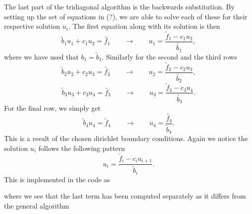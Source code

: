 \documentclass[a4paper,10pt]{article}
\begin{document}
The last part of the tridiagonal algorithm is the backwards substitution. By setting up the set of equations in (?), we are able to solve each of these for their respective solution $u_i$. The first equation along with its solution is then
\[
\tilde{b}_1 u_1 + c_1 u_2 = \tilde{f_1} \qquad \rightarrow \qquad u_1 = \frac{\tilde{f}_1 - c_1 u_2}{\tilde{b_1}},
\]
where we have used that $b_1 = \tilde{b}_1$. Similarly for the second and the third rows
\[
\tilde{b}_2 u_2 + c_2 u_3 = \tilde{f_2} \qquad \rightarrow \qquad u_2 = \frac{\tilde{f}_2 - c_2 u_3}{\tilde{b_2}},
\]
\[
\tilde{b}_3 u_3 + c_3 u_4 = \tilde{f_3} \qquad \rightarrow \qquad u_3 = \frac{\tilde{f}_3 - c_3 u_4}{\tilde{b_3}}.
\]
For the final row, we simply get
\[
\tilde{b}_4 u_4 = \tilde{f}_4 \qquad \rightarrow \qquad u_4 = \frac{\tilde{f_4}}{\tilde{b}_4}.
\]
This is a result of the chosen dirichlet boundary conditions. Again we notice the solution $u_i$ follows the following pattern
\begin{equation}
u_i = \frac{\tilde{f}_i - c_i u_{i+1}}{\tilde{b}_i}.
\end{equation}
\newpage
This is implemented in the code as

where we see that the last term has been computed separately as it differs from the general algorithm
\end{document}
